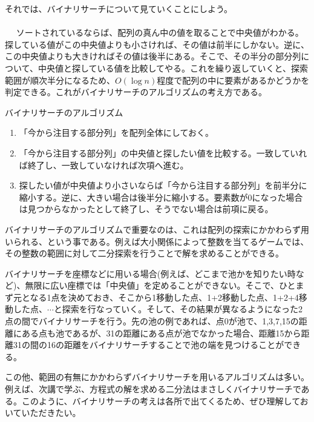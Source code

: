 それでは、バイナリサーチについて見ていくことにしよう。
\\ \\　
ソートされているならば、配列の真ん中の値を取ることで中央値がわかる。探している値がこの中央値よりも小さければ、その値は前半にしかない。逆に、この中央値よりも大きければその値は後半にある。そこで、その半分の部分列について、中央値と探している値を比較してやる。これを繰り返していくと、探索範囲が順次半分になるため、$O(\log n)$程度で配列の中に要素があるかどうかを判定できる。これがバイナリサーチのアルゴリズムの考え方である。
\begin{itembox}[l]{バイナリサーチのアルゴリズム}
\begin{enumerate}
\item 「今から注目する部分列」を配列全体にしておく。
\item 「今から注目する部分列」の中央値と探したい値を比較する。一致していれば終了し、一致していなければ次項へ進む。
\item 探したい値が中央値より小さいならば「今から注目する部分列」を前半分に縮小する。逆に、大きい場合は後半分に縮小する。要素数が0になった場合は見つからなかったとして終了し、そうでない場合は前項に戻る。
\end{enumerate}
\end{itembox}

バイナリサーチのアルゴリズムで重要なのは、これは配列の探索にかかわらず用いられる、という事である。例えば大小関係によって整数を当てるゲームでは、その整数の範囲に対して二分探索を行うことで解を求めることができる。

バイナリサーチを座標などに用いる場合(例えば、どこまで池かを知りたい時など)、無限に広い座標では「中央値」を定めることができない。そこで、ひとまず元となる1点を決めておき、そこから1移動した点、1+2移動した点、1+2+4移動した点、$\cdots$と探索を行なっていく。そして、その結果が異なるようになった2点の間でバイナリサーチを行う。先の池の例であれば、点0が池で、1,3,7,15の距離にある点も池であるが、31の距離にある点が池でなかった場合、距離15から距離31の間の16の距離をバイナリサーチすることで池の端を見つけることができる。

この他、範囲の有無にかかわらずバイナリサーチを用いるアルゴリズムは多い。例えば、次講で学ぶ、方程式の解を求める二分法はまさしくバイナリサーチである。このように、バイナリサーチの考えは各所で出てくるため、ぜひ理解しておいていただきたい。

\newpage

